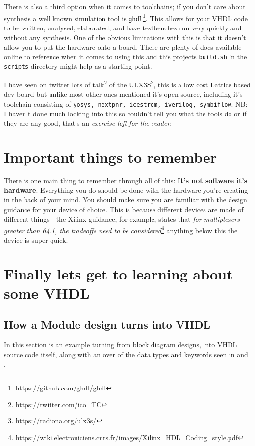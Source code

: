 There is also a third option when it comes to toolchains; if you don't care about synthesis a well known simulation tool is \texttt{ghdl}\footnote{\url{https://github.com/ghdl/ghdl}}. This allows for your VHDL code to be written, analysed, elaborated, and have testbenches run very quickly and without any synthesis. One of the obvious limitations with this is that it doesn't allow you to put the hardware onto a board. There are plenty of docs available online to reference when it comes to using this and this projects \texttt{build.sh} in the \texttt{scripts} directory might help as a starting point.  

I have seen on twitter lots of talk\footnote{\url{https://twitter.com/ico_TC}} of the ULX3S\footnote{\url{https://radiona.org/ulx3s/}}, this is a low cost Lattice based dev board but unlike most other ones mentioned it's open source, including it's toolchain consisting of \texttt{yosys, nextpnr, icestrom, iverilog, symbiflow}. NB: I haven't done much looking into this so couldn't tell you what the tools do or if they are any good, that's an \emph{exercise left for the reader}.

\section{Important things to remember}
There is one main thing to remember through all of this: \textbf{It's not software it's hardware}. Everything you do should be done with the hardware you're creating in the back of your mind. You should make sure you are familiar with the design guidance for your device of choice. This is because different devices are made of different things - the Xilinx guidance, for example, states that \emph{for multiplexers greater than 64:1, the tradeoffs need to be considered}\footnote{\url{https://wiki.electroniciens.cnrs.fr/images/Xilinx_HDL_Coding_style.pdf}} anything below this the device is super quick. 


\section{Finally lets get to learning about some VHDL}

\subsection{How a Module design turns into VHDL} 
In this section is an example turning from block diagram designs, into VHDL source code itself, along with an over of the data types and keywords seen in  and .

